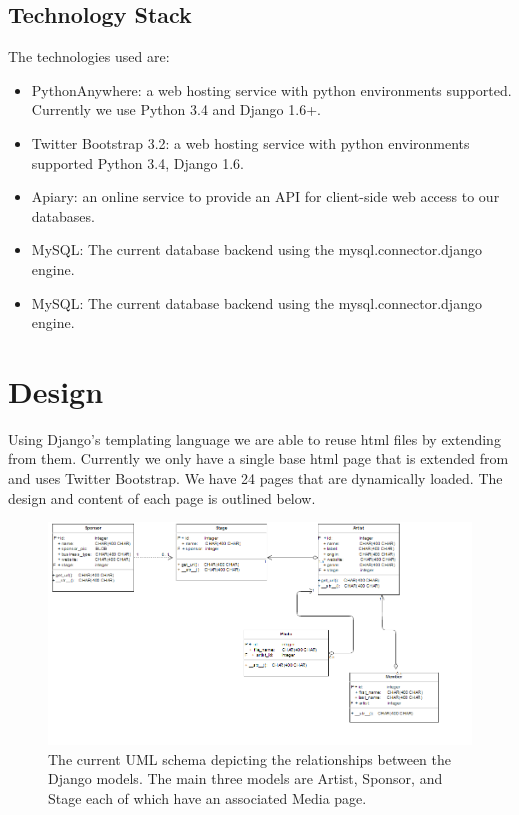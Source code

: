 \documentclass[12pt,english]{scrartcl}
\begin{document}
\subsection{Technology Stack}
The technologies used are:
\begin{itemize}
 \item PythonAnywhere: a web hosting service with python environments supported. Currently we use Python 3.4 and Django 1.6+.
\end{itemize}
\begin{itemize}
 \item Twitter Bootstrap 3.2: a web hosting service with python environments supported Python 3.4, Django 1.6.
\end{itemize}
\begin{itemize}
 \item Apiary: an online service to provide an API for client-side web access to our databases.
\end{itemize}
\begin{itemize}
 \item MySQL: The current database backend using the mysql.connector.django engine.
\end{itemize}
\begin{itemize}
 \item MySQL: The current database backend using the mysql.connector.django engine.
\end{itemize}
\section{Design}

Using Django's templating language we are able to reuse html files by extending from them. Currently we only have a single base html page that is extended from and 
uses Twitter Bootstrap. We have 24 pages that are dynamically loaded. The design and content of each page is outlined below.
\begin{figure}[h!]
\includegraphics[width=\textwidth]{UML.png}
 \caption{The current UML schema depicting the relationships between the Django models. The main three models are Artist, Sponsor, and Stage each of which have an associated Media page.}
\end{figure}
\end{document}
